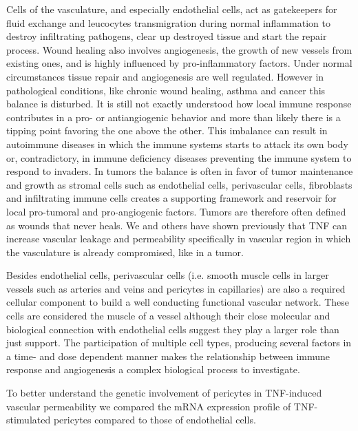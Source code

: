 Cells of the vasculature, and especially endothelial cells, act as gatekeepers for fluid exchange and leucocytes transmigration during normal inflammation to destroy infiltrating pathogens, clear up destroyed tissue and start the repair process. Wound healing also involves angiogenesis, the growth of new vessels from existing ones, and is highly influenced by pro-inflammatory factors. Under normal circumstances tissue repair and angiogenesis are well regulated. However in pathological conditions, like chronic wound healing, asthma and cancer this balance is disturbed. It is still not exactly understood how local immune response contributes in a pro- or antiangiogenic behavior and more than likely there is a tipping point favoring the one above the other. This imbalance can result in autoimmune diseases in which the immune systems starts to attack its own body or, contradictory, in immune deficiency diseases preventing the immune system to respond to invaders. In tumors the balance is often in favor of tumor maintenance and growth as stromal cells such as endothelial cells, perivascular cells, fibroblasts and infiltrating immune cells creates a supporting framework and reservoir for local pro-tumoral and pro-angiogenic factors. Tumors are therefore often defined as wounds that never heals. We and others have shown previously that TNF can increase vascular leakage and permeability specifically in vascular region in which the vasculature is already compromised, like in a tumor\cite{Ferrero_2001,R_egg_1998,Seynhaeve_2006,8479472a627b42e19c2e2cf5c8505de7,Brouckaert_2004}.

Besides endothelial cells, perivascular cells (i.e. smooth muscle cells in larger vessels such as arteries and veins and pericytes in capillaries) are also a required cellular component to build a well conducting functional vascular network. These cells are considered the muscle of a vessel although their close molecular and biological connection with endothelial cells suggest they play a larger role than just support\cite{Seynhaeve_2018,Brandt_2019,Caporali_2017}. The participation of multiple cell types, producing several factors in a time- and dose dependent manner makes the relationship between immune response and angiogenesis a complex biological process to investigate.

To better understand the genetic involvement of pericytes in TNF-induced vascular permeability we compared the mRNA expression profile of TNF-stimulated pericytes compared to those of endothelial cells.

